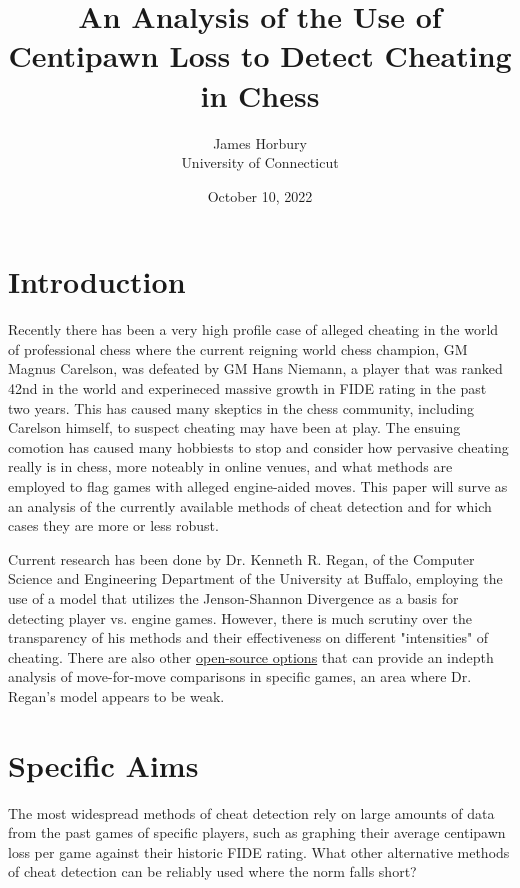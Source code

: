 \documentclass[12pt]{article}
\title{An Analysis of the Use of Centipawn Loss to Detect Cheating in Chess}
\author{James Horbury\\
    University of Connecticut
}
\date{October 10, 2022}
\begin{document}
\maketitle

\section*{Introduction}
\label{sec:intro}

Recently there has been a very high profile case of alleged cheating in the world of professional chess 
where the current reigning world chess champion, GM Magnus Carelson, was defeated by GM Hans Niemann, a player 
that was ranked 42nd in the world and experineced massive growth in FIDE rating in the past two years. This 
has caused many skeptics in the chess community, including Carelson himself, to suspect cheating may have been 
at play. The ensuing comotion has caused many hobbiests to stop and consider how pervasive cheating
really is in chess, more noteably in online venues, and what methods are employed to flag games with alleged 
engine-aided moves. This paper will surve as an analysis of the currently available methods of cheat detection 
and for which cases they are more or less robust.

Current research \citep{regan2011understanding} has been done by Dr. Kenneth R. Regan, of the Computer Science and Engineering 
Department of the University at Buffalo, employing the use of a model that utilizes the Jenson-Shannon 
Divergence as a basis for detecting player vs. engine games. However, there is much scrutiny over the 
transparency of his methods and their effectiveness on different "intensities" of cheating. There are also 
other \href{https://github.com/MGleason1/PGN-Spy}{open-source options} that can provide an indepth analysis of move-for-move comparisons
in specific games, an area where Dr. Regan's model appears to be weak.

\section*{Specific Aims}
\label{sec:spec}

The most widespread methods of cheat detection rely on large amounts of data from the past games of specific 
players, such as graphing their average centipawn loss per game against their historic FIDE rating. What other 
alternative methods of cheat detection can be reliably used where the norm falls short?
\end{document}
